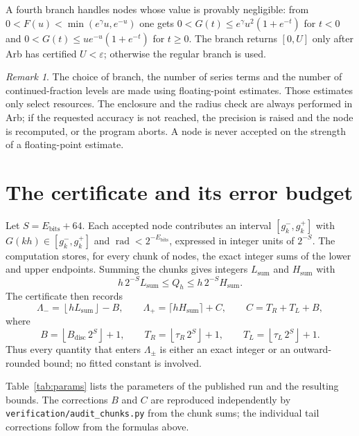 \documentclass[11pt,a4paper]{article}
\theoremstyle{remark}
\newtheorem*{remark}{Remark}
\newcommand{\floor}[1]{\left\lfloor #1 \right\rfloor}
\DeclareMathOperator{\rad}{rad}
\begin{document}
A fourth branch handles nodes whose value is provably negligible: from
$0<F(u)<\min(e^\gamma u,e^{-u})$ one gets
$0<G(t)\le e^\gamma u^2(1+e^{-t})$ for $t<0$ and
$0<G(t)\le ue^{-u}(1+e^{-t})$ for $t\ge0$. The branch returns $[0,U]$
only after Arb has certified $U<\varepsilon$; otherwise the regular
branch is used.

\begin{remark}
The choice of branch, the number of series terms and the number of
continued-fraction levels are made using floating-point estimates.
Those estimates only select resources. The enclosure and the radius
check are always performed in Arb; if the requested accuracy is not
reached, the precision is raised and the node is recomputed, or the
program aborts. A node is never accepted on the strength of a
floating-point estimate.
\end{remark}

\section{The certificate and its error budget}

Let $S=E_{\mathrm{bits}}+64$. Each accepted node contributes an interval
$[g_k^-,g_k^+]$ with $G(kh)\in[g_k^-,g_k^+]$ and
$\rad<2^{-E_{\mathrm{bits}}}$, expressed in integer units of $2^{-S}$.
The computation stores, for every chunk of nodes, the exact integer sums
of the lower and upper endpoints. Summing the chunks gives integers
$L_{\mathrm{sum}}$ and $H_{\mathrm{sum}}$ with
\begin{equation}
  h\,2^{-S}L_{\mathrm{sum}}\le Q_h\le h\,2^{-S}H_{\mathrm{sum}} .
\end{equation}
The certificate then records
\begin{equation}
  \Lambda_-=\floor{hL_{\mathrm{sum}}}-B,\qquad
  \Lambda_+=\lceil hH_{\mathrm{sum}}\rceil+C,\qquad
  C=T_R+T_L+B,
  \label{eq:cert}
\end{equation}
where
\begin{equation}
  B=\floor{B_{\mathrm{disc}}\,2^S}+1,\qquad
  T_R=\floor{\tau_R\,2^S}+1,\qquad
  T_L=\floor{\tau_L\,2^S}+1 .
\end{equation}
Thus every quantity that enters $\Lambda_\pm$ is either an exact integer
or an outward-rounded bound; no fitted constant is involved.

Table~\ref{tab:params} lists the parameters of the published run and the
resulting bounds. The corrections $B$ and $C$ are reproduced
independently by \texttt{verification/audit\_chunks.py} from the chunk
sums; the individual tail corrections follow from the formulas above.
\end{document}

